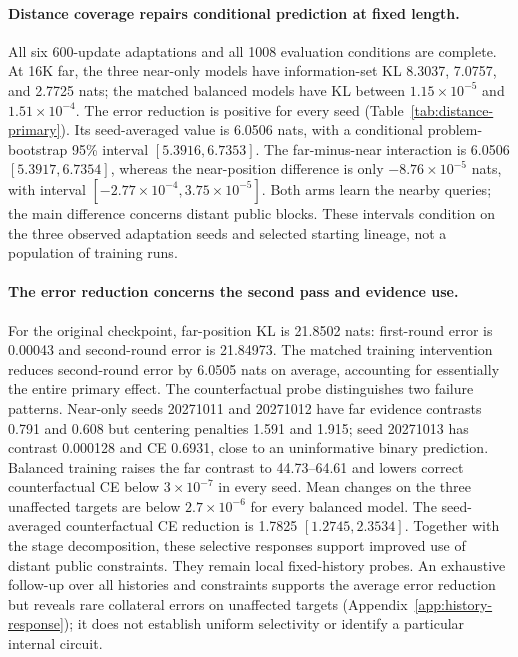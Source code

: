 \paragraph{Distance coverage repairs conditional prediction at fixed length.}
All six 600-update adaptations and all 1008 evaluation conditions are complete.
At 16K far, the three near-only models have information-set KL 8.3037, 7.0757,
and 2.7725 nats; the matched balanced models have KL between
$1.15\times10^{-5}$ and $1.51\times10^{-4}$.
The error reduction is positive for every seed (Table~\ref{tab:distance-primary}).
Its seed-averaged value is 6.0506 nats, with a conditional problem-bootstrap
95\% interval $[5.3916,6.7353]$. The far-minus-near interaction is 6.0506
$[5.3917,6.7354]$, whereas the near-position difference is only
$-8.76\times10^{-5}$ nats, with interval
$[-2.77\times10^{-4},3.75\times10^{-5}]$.
Both arms learn the nearby queries; the main difference concerns distant
public blocks. These intervals condition on the three observed adaptation
seeds and selected starting lineage, not a population of training runs.

\begin{table}[t]
\centering\small
\caption{Primary 16K far-position contrast over 32 paired problems. Reduction
is near-only minus balanced conditional error; here $D=0$, so KL equals $E$.
All three matched adaptation seeds are retained. Intervals resample problems,
with the seed mean computed within each problem before resampling.}
\resizebox{\linewidth}{!}{}
\label{tab:distance-primary}
\end{table}

\paragraph{The error reduction concerns the second pass and evidence use.}
For the original checkpoint, far-position KL is 21.8502 nats: first-round
error is 0.00043 and second-round error is 21.84973. The matched training
intervention reduces second-round error by 6.0505 nats on average,
accounting for essentially the entire primary effect.
The counterfactual probe distinguishes two failure patterns. Near-only seeds
20271011 and 20271012 have far evidence contrasts 0.791 and 0.608 but centering
penalties 1.591 and 1.915; seed 20271013 has contrast 0.000128 and CE 0.6931,
close to an uninformative binary prediction. Balanced training raises the
far contrast to 44.73--64.61 and lowers correct counterfactual CE below
$3\times10^{-7}$ in every seed. Mean changes on the three unaffected targets
are below $2.7\times10^{-6}$ for every balanced model.
The seed-averaged counterfactual CE reduction is 1.7825
$[1.2745,2.3534]$. Together with the stage decomposition, these selective
responses support improved use of distant public constraints. They remain
local fixed-history probes. An exhaustive follow-up over all histories and
constraints supports the average error reduction but reveals rare collateral
errors on unaffected targets (Appendix~\ref{app:history-response}); it does not
establish uniform selectivity or identify a particular internal circuit.

